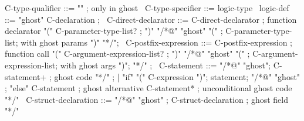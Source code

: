 \begin{syntax}

  C-type-qualifier ::= { "\ghost" } ; only in ghost
  \
  C-type-specifier ::= { logic-type }
  \
  logic-def ::= "ghost" C-declaration ;
  \
  C-direct-declarator ::=
      C-direct-declarator ; function declarator
      "(" C-parameter-type-list? ;
      ")" "/*@" "ghost" "(" ;
          C-parameter-type-list; with ghost params
      ")" "*/";
  \
  C-postfix-expression ::=
      C-postfix-expression ; function call
      "(" C-argument-expression-list? ;
       ")" "/*@" "ghost" "(" ;
           C-argument-expression-list; with ghost args
       ")";
      "*/" ;
   \
  C-statement ::=
      "/*@" "ghost";
            C-statement+ ; ghost code
      "*/" ;
    | "if" "(" C-expression ")";
       statement;
       "/*@" "ghost" ;
             "else" C-statement ; ghost alternative
        C-statement* ; unconditional ghost code
      "*/"
  \
  C-struct-declaration ::=
    {"/*@" "ghost" };
          {C-struct-declaration} ; ghost field
    {"*/"}
\end{syntax}
